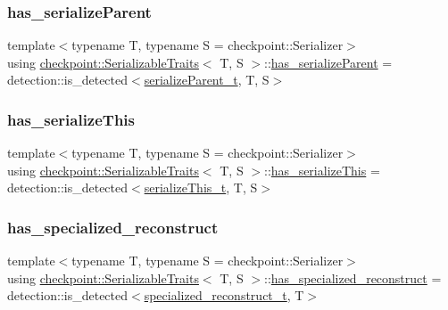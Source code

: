 \subsubsection{\texorpdfstring{has\+\_\+serialize\+Parent}{has\_serializeParent}}
{\footnotesize\ttfamily template$<$typename T, typename S = checkpoint\+::\+Serializer$>$ \\
using \hyperlink{structcheckpoint_1_1_serializable_traits}{checkpoint\+::\+Serializable\+Traits}$<$ T, S $>$\+::\hyperlink{structcheckpoint_1_1_serializable_traits_a4785b7f54369ec889ac5a25a8256a578}{has\+\_\+serialize\+Parent} =  detection\+::is\+\_\+detected$<$\hyperlink{structcheckpoint_1_1_serializable_traits_a38585e5b9aa0653c08ff48504e922ad5}{serialize\+Parent\+\_\+t}, T, S$>$}

\mbox{\label{structcheckpoint_1_1_serializable_traits_adc99520813c22cf61ab70ba2fea3cdc6}} 
\subsubsection{\texorpdfstring{has\+\_\+serialize\+This}{has\_serializeThis}}
{\footnotesize\ttfamily template$<$typename T, typename S = checkpoint\+::\+Serializer$>$ \\
using \hyperlink{structcheckpoint_1_1_serializable_traits}{checkpoint\+::\+Serializable\+Traits}$<$ T, S $>$\+::\hyperlink{structcheckpoint_1_1_serializable_traits_adc99520813c22cf61ab70ba2fea3cdc6}{has\+\_\+serialize\+This} =  detection\+::is\+\_\+detected$<$\hyperlink{structcheckpoint_1_1_serializable_traits_ac81eb64532a65d97dc995e582ef708ad}{serialize\+This\+\_\+t}, T, S$>$}

\mbox{\label{structcheckpoint_1_1_serializable_traits_afa7760f6127136a1772b90cbe9922bc3}} 
\subsubsection{\texorpdfstring{has\+\_\+specialized\+\_\+reconstruct}{has\_specialized\_reconstruct}}
{\footnotesize\ttfamily template$<$typename T, typename S = checkpoint\+::\+Serializer$>$ \\
using \hyperlink{structcheckpoint_1_1_serializable_traits}{checkpoint\+::\+Serializable\+Traits}$<$ T, S $>$\+::\hyperlink{structcheckpoint_1_1_serializable_traits_afa7760f6127136a1772b90cbe9922bc3}{has\+\_\+specialized\+\_\+reconstruct} =  detection\+::is\+\_\+detected$<$\hyperlink{structcheckpoint_1_1_serializable_traits_a914c73251ad840e5370f1ac7cb1c18de}{specialized\+\_\+reconstruct\+\_\+t}, T$>$}

